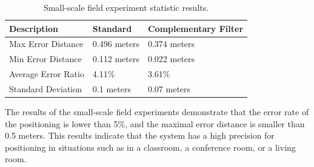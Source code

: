 \begin{table}
\begin{center}
    \begin{tabular}{ | l | l | l |}
    \hline
    Description & Standard & Complementary Filter \\ \hline\hline
    Max Error Distance & 0.496 meters & 0.374 meters \\ \hline
    Min Error Distance & 0.112 meters & 0.022 meters \\ \hline
    Average Error Ratio & 4.11\% & 3.61\% \\ \hline
    Standard Deviation & 0.1 meters & 0.07 meters \\ \hline
    \end{tabular}
\end{center}
\caption{Small-scale field experiment statistic results.}\label{tb-small-scale-analysis}
\end{table}
The results of the small-scale field experiments demonstrate that the error rate of the positioning is lower than 5\%, and the maximal error distance is smaller than 0.5 meters. This results indicate that the system has a high precision for positioning in situations such as in a classroom, a conference room, or a living room.
